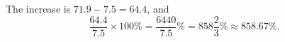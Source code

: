 The increase is $71.9-7.5=64.4$, and
\[\dfrac{64.4}{7.5}\times100\%=\dfrac{6440}{7.5}\%=\boxed{858\dfrac23\%}\approx858.67\%.\]
